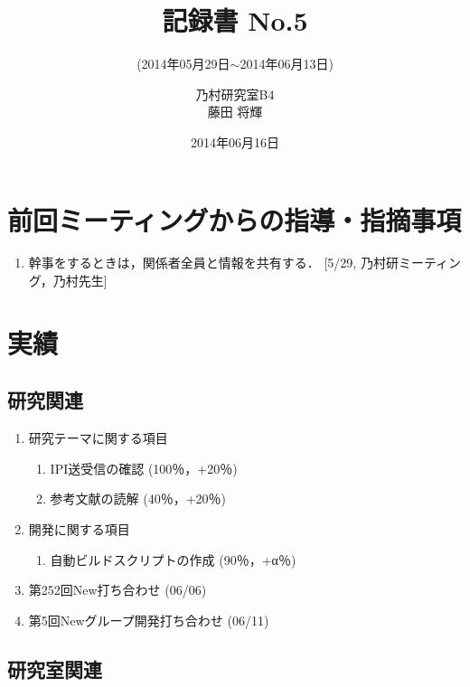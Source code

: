 \documentclass[fleqn, 14pt]{extarticle}
\subtitle{(2014年05月29日$\sim$2014年06月13日)}
\author{乃村研究室B4\\藤田 将輝}
\date{2014年06月16日}
\title{記録書 No.5}
\begin{document}
\maketitle




\section{前回ミーティングからの指導・指摘事項}
\label{sec-1}
\begin{enumerate}
\item 幹事をするときは，関係者全員と情報を共有する．
\newline
\hfill
[5/29, 乃村研ミーティング，乃村先生]
\end{enumerate}




\section{実績}
\label{sec-2}


\subsection{研究関連}
\label{sec-2-1}
\begin{enumerate}
\item 研究テーマに関する項目
\hfill
\label{enum-research1}
\begin{enumerate}

\item IPI送受信の確認
\hfill
\label{enum-1-A}
(100％，+20％)
\item 参考文献の読解
\hfill
\label{enum-1-B}
(40％，+20％)
\end{enumerate}
\item 開発に関する項目
\hfill
\label{enum-research2}
\begin{enumerate}

\item 自動ビルドスクリプトの作成
\hfill
\label{enum-2-A}
(90％，+α％)
\end{enumerate}

\item 第252回New打ち合わせ
\hfill
\label{enum-laboratory2}
(06/06)
\item 第5回Newグループ開発打ち合わせ
\hfill
\label{enum-laboratory3}
(06/11)

\end{enumerate}


\subsection{研究室関連}
\label{sec-2-2}
\end{document}
